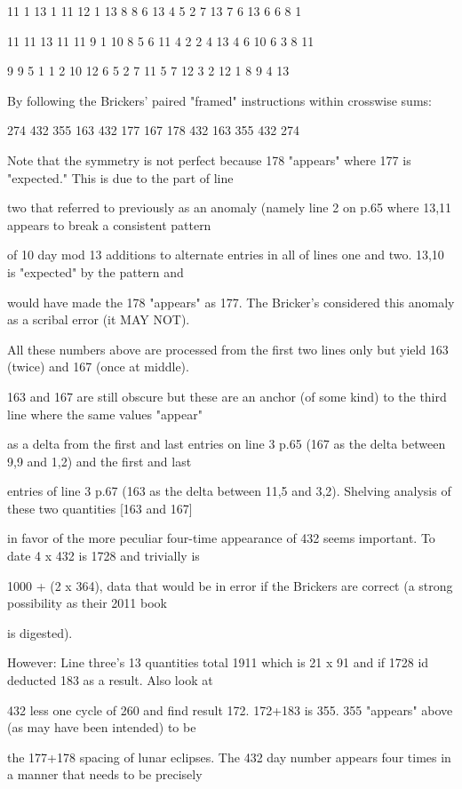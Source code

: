 \documentclass[12pt]{article}
\begin{document}
11 1 13 1 11 12 1 13 8 8 6 13 4 5 2 7 13 7 6 13 6 6 8 1

11 11 13 11 11 9 1 10 8 5 6 11 4 2 2 4 13 4 6 10 6 3 8 11

9 9 5 1 1 2 10 12 6 5 2 7 11 5 7 12 3 2 12 1 8 9 4 13
 
By following the Brickers' paired "framed" instructions within crosswise sums: 

274 432 355 163 432 177 167 178 432 163 355 432 274 

Note that the symmetry is not perfect because 178 "appears" where 177 is "expected." This is due to the part of line 

two that referred to previously  as an anomaly (namely line 2 on p.65 where 13,11 appears to break a consistent pattern
 
of 10 day mod 13 additions to alternate entries in all of lines one and two. 13,10 is "expected" by the pattern and

would have made the 178 "appears" as 177.  The Bricker's considered this anomaly as a scribal error (it MAY NOT). 

All these numbers above are processed from the first two lines only but yield 163 (twice) and 167 (once at middle). 

163 and 167 are still obscure but these are an anchor (of some kind) to the third line where the same values "appear" 

as a delta from the first and last entries on line 3 p.65 (167 as the delta between 9,9 and 1,2) and the first and last

entries of line 3 p.67 (163 as the delta between 11,5 and 3,2). Shelving analysis of these two quantities [163 and 167]

in favor of the more peculiar four-time appearance of 432 seems important. To date 4 x 432 is 1728 and trivially is

1000 + (2 x 364), data that would be in error if the Brickers are correct (a strong possibility as their 2011 book

is digested).

However: Line three's 13 quantities total 1911 which is 21 x 91 and if 1728 id deducted 183 as a result. Also look at

432 less one cycle of 260 and find result 172. 172+183 is 355. 355 "appears" above (as may have been intended) to be

the 177+178 spacing of lunar eclipses.  The 432 day number appears four times in a manner that needs to be precisely
\end{document}
